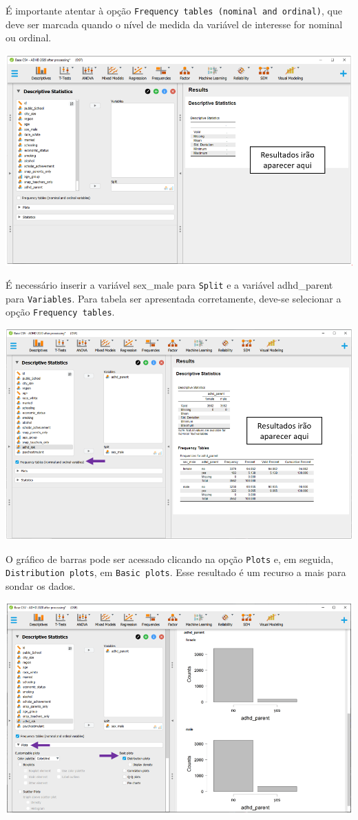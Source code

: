 \documentclass[
]{book}
\begin{document}
É importante atentar à opção \texttt{Frequency\ tables\ (nominal\ and\ ordinal)}, que deve ser marcada quando o nível de medida da variável de interesse for nominal ou ordinal.

\includegraphics{./img/cap_x2_primeira_tabela.png}

É necessário inserir a variável sex\_male para \texttt{Split} e a variável adhd\_parent para \texttt{Variables}. Para tabela ser apresentada corretamente, deve-se selecionar a opção \texttt{Frequency\ tables}.

\includegraphics{./img/cap_x2_descritivo.png}

O gráfico de barras pode ser acessado clicando na opção \texttt{Plots} e, em seguida, \texttt{Distribution\ plots}, em \texttt{Basic\ plots}. Esse resultado é um recurso a mais para sondar os dados.

\includegraphics{./img/cap_x2_grafico.png}
\end{document}
